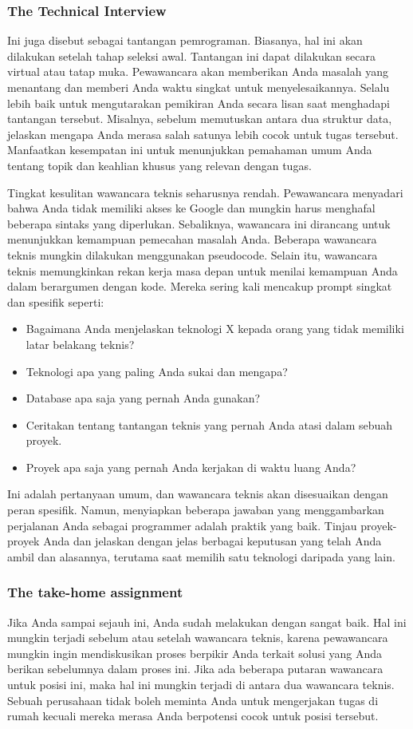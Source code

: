 \documentclass{article}
\begin{document}
\subsubsection{The Technical Interview}
Ini juga disebut sebagai tantangan pemrograman. Biasanya, hal ini akan dilakukan setelah tahap seleksi awal. Tantangan ini dapat dilakukan secara virtual atau tatap muka. Pewawancara akan memberikan Anda masalah yang menantang dan memberi Anda waktu singkat untuk menyelesaikannya. Selalu lebih baik untuk mengutarakan pemikiran Anda secara lisan saat menghadapi tantangan tersebut. Misalnya, sebelum memutuskan antara dua struktur data, jelaskan mengapa Anda merasa salah satunya lebih cocok untuk tugas tersebut. Manfaatkan kesempatan ini untuk menunjukkan pemahaman umum Anda tentang topik dan keahlian khusus yang relevan dengan tugas.

Tingkat kesulitan wawancara teknis seharusnya rendah. Pewawancara menyadari bahwa Anda tidak memiliki akses ke Google dan mungkin harus menghafal beberapa sintaks yang diperlukan. Sebaliknya, wawancara ini dirancang untuk menunjukkan kemampuan pemecahan masalah Anda. Beberapa wawancara teknis mungkin dilakukan menggunakan pseudocode. Selain itu, wawancara teknis memungkinkan rekan kerja masa depan untuk menilai kemampuan Anda dalam berargumen dengan kode. Mereka sering kali mencakup prompt singkat dan spesifik seperti:
\begin{itemize}
    \item Bagaimana Anda menjelaskan teknologi X kepada orang yang tidak memiliki latar belakang teknis?
    \item Teknologi apa yang paling Anda sukai dan mengapa?
    \item Database apa saja yang pernah Anda gunakan?
    \item Ceritakan tentang tantangan teknis yang pernah Anda atasi dalam sebuah proyek.
    \item Proyek apa saja yang pernah Anda kerjakan di waktu luang Anda?
\end{itemize}

Ini adalah pertanyaan umum, dan wawancara teknis akan disesuaikan dengan peran spesifik. Namun, menyiapkan beberapa jawaban yang menggambarkan perjalanan Anda sebagai programmer adalah praktik yang baik. Tinjau proyek-proyek Anda dan jelaskan dengan jelas berbagai keputusan yang telah Anda ambil dan alasannya, terutama saat memilih satu teknologi daripada yang lain.

\subsubsection{The take-home assignment}
Jika Anda sampai sejauh ini, Anda sudah melakukan dengan sangat baik. Hal ini mungkin terjadi sebelum atau setelah wawancara teknis, karena pewawancara mungkin ingin mendiskusikan proses berpikir Anda terkait solusi yang Anda berikan sebelumnya dalam proses ini. Jika ada beberapa putaran wawancara untuk posisi ini, maka hal ini mungkin terjadi di antara dua wawancara teknis. Sebuah perusahaan tidak boleh meminta Anda untuk mengerjakan tugas di rumah kecuali mereka merasa Anda berpotensi cocok untuk posisi tersebut.
\end{document}
